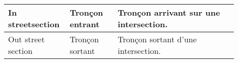 \begin{longtable}{|p{0.2\linewidth}|p{0.2\linewidth}|p{0.5\linewidth}|}
In streetsection                            & Tronçon entrant                & Tronçon arrivant sur une intersection.                                                                                                                                                                                                                                              \\ \hline
Out street section                          & Tronçon sortant                & Tronçon sortant d'une intersection.                                                                                                                                                                                                                                                 \\ \hline
\end{longtable}%
